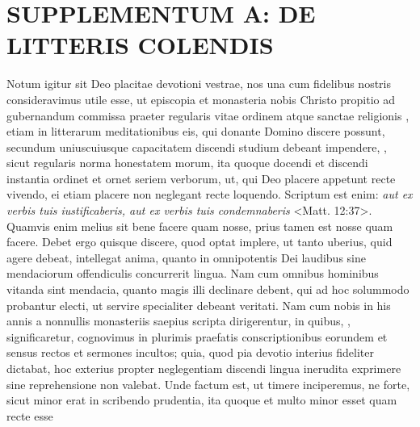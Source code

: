 \documentclass[12pt]{article}
\begin{document}
	\clearpage
	{\small
		\section{SUPPLEMENTUM A: DE LITTERIS COLENDIS}
		\beginnumbering
		\pstart
		\noindent
	Notum igitur sit Deo placitae devotioni vestrae,  nos una cum fidelibus nostris consideravimus utile esse, ut episcopia et monasteria nobis Christo propitio ad gubernandum commissa praeter regularis vitae ordinem atque sanctae religionis , etiam in litterarum meditationibus eis, qui donante Domino discere possunt, secundum uniuscuiusque capacitatem discendi studium debeant impendere, , sicut regularis norma honestatem morum, ita quoque docendi et discendi instantia ordinet et ornet seriem verborum, ut, qui Deo placere appetunt recte vivendo, ei etiam placere non neglegant recte loquendo. Scriptum est enim: \textit{aut ex verbis tuis iustificaberis, aut ex verbis tuis condemnaberis} <Matt. 12:37>. Quamvis enim melius sit bene facere quam nosse, prius tamen est nosse quam facere. Debet ergo quisque discere, quod optat implere, ut tanto uberius, quid agere debeat, intellegat anima, quanto in omnipotentis Dei laudibus sine mendaciorum offendiculis concurrerit lingua.
		\pend
		\pstart
		Nam cum omnibus hominibus vitanda sint mendacia, quanto magis illi  declinare debent, qui ad hoc solummodo probantur electi, ut servire specialiter debeant veritati. Nam cum nobis in his annis a nonnullis monasteriis saepius scripta dirigerentur, in quibus, , significaretur, cognovimus in plurimis praefatis conscriptionibus eorundem et sensus rectos et sermones incultos; quia, quod pia devotio interius fideliter dictabat, hoc exterius propter neglegentiam discendi lingua inerudita exprimere sine reprehensione non valebat. Unde factum est, ut timere inciperemus, ne forte, sicut minor erat in scribendo prudentia, ita quoque et multo minor esset quam recte esse 
}
\end{document}
